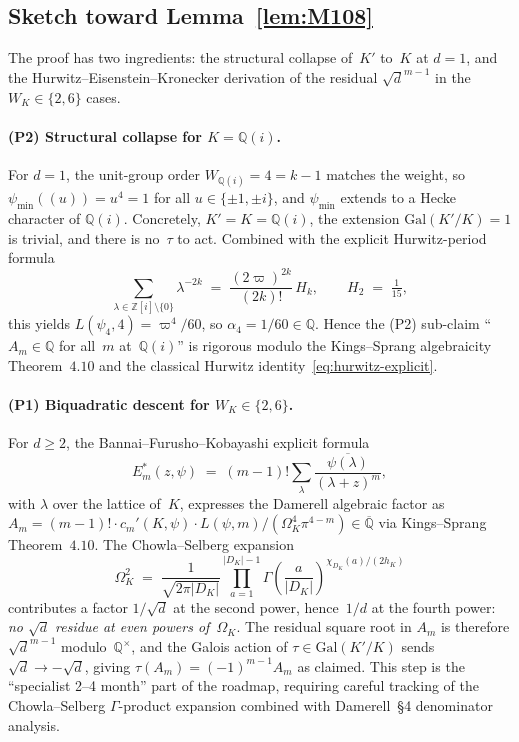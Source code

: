 \documentclass[10pt]{article}
\theoremstyle{definition}
\newcommand{\Q}{\mathbb{Q}}
\newcommand{\Z}{\mathbb{Z}}
\begin{document}
\subsection{Sketch toward Lemma~\ref{lem:M108}}

The proof has two ingredients: the structural collapse of~$K'$ to~$K$ at
$d = 1$, and the Hurwitz--Eisenstein--Kronecker derivation of the residual
$\sqrt{d}^{m-1}$ in the $W_K \in \{2, 6\}$ cases.

\paragraph{(P2) Structural collapse for $K = \Q(i)$.}
For $d = 1$, the unit-group order $W_{\Q(i)} = 4 = k-1$ matches the weight, so
$\psi_{\min}((u)) = u^4 = 1$ for all $u \in \{\pm 1, \pm i\}$, and $\psi_{\min}$
extends to a Hecke character of $\Q(i)$.  Concretely, $K' = K = \Q(i)$, the
extension $\mathrm{Gal}(K'/K) = 1$ is trivial, and there is no~$\tau$ to act.
Combined with the explicit Hurwitz-period formula
\begin{equation}
  \sum_{\lambda \in \Z[i] \setminus\{0\}} \lambda^{-2k}
  \;=\; \frac{(2 \varpi)^{2k}}{(2k)!} \, H_k,
  \qquad
  H_2 \;=\; \tfrac{1}{15},
\label{eq:hurwitz-explicit}
\end{equation}
this yields $L(\psi_4, 4) = \varpi^4/60$, so $\alpha_4 = 1/60 \in \Q$.  Hence
the (P2) sub-claim ``$A_m \in \Q$ for all~$m$ at~$\Q(i)$'' is rigorous modulo
the Kings--Sprang \cite{KingsSprang2025} algebraicity Theorem~$4.10$ and the
classical Hurwitz identity~\eqref{eq:hurwitz-explicit}.

\paragraph{(P1) Biquadratic descent for $W_K \in \{2, 6\}$.}
For $d \geq 2$, the Bannai--Furusho--Kobayashi \cite{BFK15} explicit formula
\begin{equation}
  E_m^*(z, \psi) \;=\; (m-1)! \sum_\lambda \frac{\overline{\psi(\lambda)}}{(\lambda + z)^m},
\end{equation}
with $\lambda$ over the lattice of~$K$, expresses the Damerell algebraic factor
as $A_m = (m-1)! \cdot c_m'(K, \psi) \cdot L(\psi, m) / (\Omega_K^{4} \pi^{4-m}) \in
\overline{\Q}$ via Kings--Sprang Theorem~$4.10$.  The Chowla--Selberg
expansion
\begin{equation}
  \Omega_K^2 \;=\; \frac{1}{\sqrt{2 \pi |D_K|}}
  \prod_{a=1}^{|D_K|-1} \Gamma\!\left(\frac{a}{|D_K|}\right)^{\chi_{D_K}(a)/(2 h_K)}
\end{equation}
contributes a factor $1/\sqrt{d}$ at the second power, hence~$1/d$ at the
fourth power: \emph{no $\sqrt{d}$ residue at even powers of~$\Omega_K$}.  The
residual square root in $A_m$ is therefore $\sqrt{d}^{m-1}$ modulo~$\Q^\times$,
and the Galois action of $\tau \in \mathrm{Gal}(K'/K)$ sends $\sqrt{d} \to
-\sqrt{d}$, giving $\tau(A_m) = (-1)^{m-1} A_m$ as claimed.  This step is the
``specialist 2--4 month'' part of the roadmap, requiring careful tracking of
the Chowla--Selberg $\Gamma$-product expansion combined with Damerell~\S 4
denominator analysis.
\end{document}
